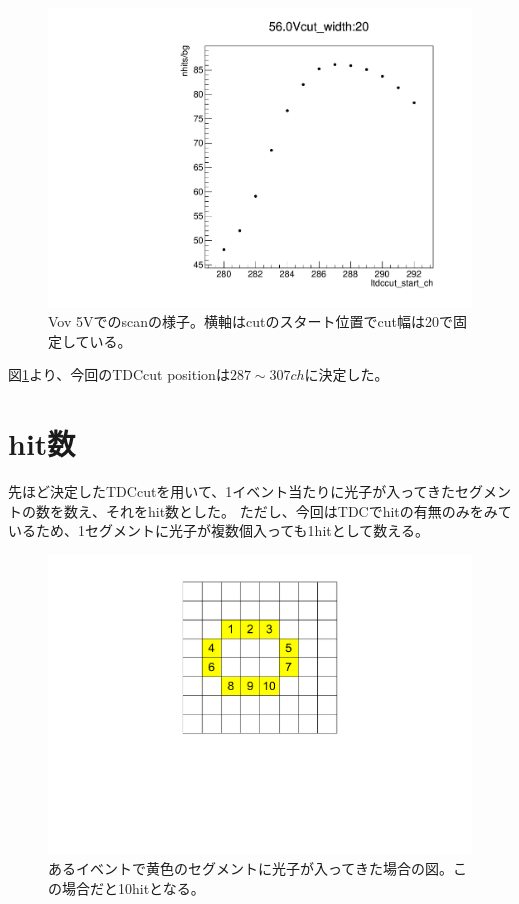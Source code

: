 \documentclass[uplatex, titlepage, dvipdfmx, 12pt, a4paper]{jsreport}
\begin{document}
  \begin{figure}[htbp]
    \begin{center} 
      \includegraphics[clip, scale=0.3]{image/TDCcut_scan.pdf}
      \caption{Vov 5\si{V}でのscanの様子。横軸はcutのスタート位置でcut幅は20で固定している。}
      \label{fig:tdc_scan} 
    \end{center}
  \end{figure}
  図\ref{fig:tdc_scan}より、今回のTDCcut positionは$287\sim307 \si{ch}$に決定した。

  \section{hit数}
    先ほど決定したTDCcutを用いて、1イベント当たりに光子が入ってきたセグメントの数を数え、それをhit数とした。
    ただし、今回はTDCでhitの有無のみをみているため、1セグメントに光子が複数個入っても1hitとして数える。
    \begin{figure}[h]
      \begin{center} 
        \includegraphics[scale=0.5, clip]{image/hit_image.pdf}
        \caption{あるイベントで黄色のセグメントに光子が入ってきた場合の図。この場合だと10hitとなる。} 
        \label{fig:hit_image} 
      \end{center}
    \end{figure}
    
\end{document}
